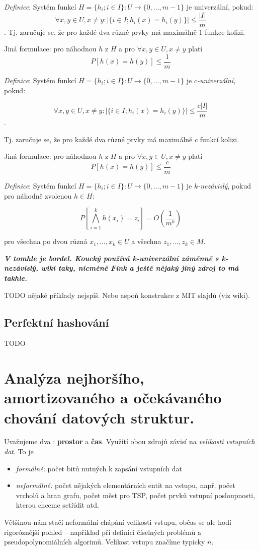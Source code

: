 \documentclass[11pt]{report} %
\numberwithin{equation}{section}
\begin{document}
\emph{Definice}: Systém funkcí $H = \{ h_i; i \in I\}: U\to \{0,\dots,m-1\}$ je univerzální, pokud:
$$\forall x,y\in U, x\neq y: |\{i\in I; h_i(x)=h_i(y)\}|\leq \frac{|I|}{m}$$.
Tj. zaručuje se, že pro každé dva různé prvky má maximálně $1$ funkce kolizi.

Jiná formulace: pro náhodnou $h$ z $H$ a pro $\forall x,y \in U, x \neq y$ platí $$P[h(x) = h(y)] \leq \frac{1}{m}$$

\emph{Definice}: Systém funkcí $H = \{ h_i; i \in I\}: U\to \{0,\dots,m-1\}$ je $c$\emph{-univerzální}, pokud:

$$\forall x,y\in U, x\neq y: |\{i\in I; h_i(x)=h_i(y)\}|\leq \frac{c|I|}{m}$$.

Tj. zaručuje se, že pro každé dva různé prvky má maximálně $c$ funkcí kolizi.

Jiná formulace: pro náhodnou $h$ z $H$ a pro $\forall x,y \in U, x \neq y$ platí $$P[h(x) = h(y)] \leq \frac{c}{m}$$

\emph{Definice}: Systém funkcí $H = \{ h_i; i \in I\}: U\to \{0,\dots,m-1\}$ je $k$\emph{-nezávislý}, pokud pro náhodně zvolenou $h \in H$:

$$P[\bigwedge_{i=1}^{k} h(x_i) = z_i] = O(\frac{1}{m^k})$$

pro všechna po dvou různá $x_1, \dots, x_k \in U$ a všechna $z_1,\dots, z_k \in M$.

\textit{\textbf{V tomhle je bordel. Koucký používá k-univerzální záměnně s k-nezávislý, wiki taky, nicméně Fink a ještě nějaký jiný zdroj to má takhle.}}

TODO nějaké příklady nejspíš. Nebo aspoň konstrukce z MIT slajdů (viz wiki).

\subsection{Perfektní hashování}\label{perfektnuxed-hashovuxe1nuxed}

TODO



\section{Analýza nejhoršího, amortizovaného a očekávaného chování datových struktur.}
Uvažujeme dva : \textbf{prostor} a \textbf{čas}. Využití obou zdrojů závisí na \textit{velikosti vstupních dat}. To je
\begin{itemize}
	\item \textit{formálně:} počet bitů nutných k zapsání vstupních dat
	\item \textit{neformálně:} počet nějakých elementárních entit na vstupu, např. počet vrcholů a hran grafu, počet měst pro TSP, počet prvků vstupní posloupnosti, kterou chceme setřídit atd.
\end{itemize} 
Většinou nám stačí neformální chápání velikosti vstupu, občas se ale hodí rigoróznější pohled -- například při definici číselných problémů a pseudopolynomiálních algorimů. Velikost vstupu značíme typicky $n$.
\end{document}
